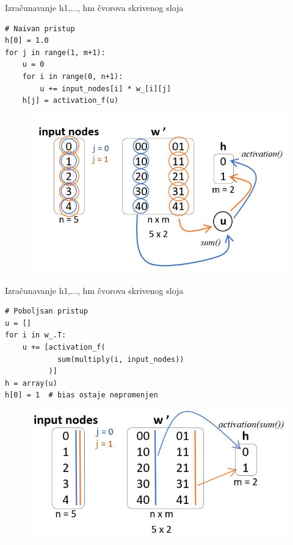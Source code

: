 \documentclass{beamer}
\begin{document}
\begin{frame}[fragile]{Izračunavanje h1,..., hm čvorova skrivenog sloja}
\begin{verbatim}
# Naivan pristup
h[0] = 1.0
for j in range(1, m+1):
    u = 0
    for i in range(0, n+1):
        u += input_nodes[i] * w_[i][j]
    h[j] = activation_f(u)
\end{verbatim}
\begin{figure}
    \centering
    \includegraphics[scale=0.5]{naivno_izracunavanje_w_.JPG}
\end{figure}
\end{frame}

\begin{frame}[fragile]{Izračunavanje h1,..., hm čvorova skrivenog sloja}
\begin{verbatim}
# Poboljsan pristup
u = []
for i in w_.T:
    u += [activation_f(
            sum(multiply(i, input_nodes))
          )]
h = array(u)
h[0] = 1  # bias ostaje nepromenjen
\end{verbatim}
\begin{figure}
    \centering
    \includegraphics[scale=0.5]{izracunavanje_w_.JPG}
\end{figure}
\end{frame}
\end{document}
